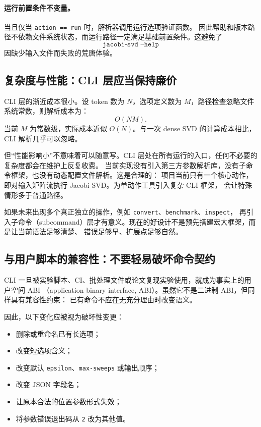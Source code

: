 \paragraph{运行前置条件不变量。}
当且仅当 \texttt{action == run} 时，解析器调用运行选项验证函数。
因此帮助和版本路径不依赖文件系统状态，而运行路径一定满足基础前置条件。这避免了
\[
    \texttt{jacobi-svd --help}
\]
因缺少输入文件而失败的荒唐体验。

\subsection{复杂度与性能：CLI 层应当保持廉价}

CLI 层的渐近成本很小。设 token 数为 $N$，选项定义数为 $M$，路径检查忽略文件系统常数，则解析成本为：
\[
    O(NM).
\]
当前 $M$ 为常数级，实际成本近似 $O(N)$。与一次 dense SVD 的计算成本相比，CLI 解析几乎可以忽略。

但“性能影响小”不意味着可以随意写。CLI 层处在所有运行的入口，任何不必要的复杂度都会在维护上反复收费。
当前实现没有引入第三方参数解析库，没有子命令框架，也没有动态配置文件解析。这是合理的：
项目当前只有一个核心动作，即对输入矩阵流执行 Jacobi SVD。为单动作工具引入复杂 CLI 框架，
会让特殊情形多于普通路径。

如果未来出现多个真正独立的操作，例如 \texttt{convert}、\texttt{benchmark}、\texttt{inspect}，
再引入子命令（subcommand）层才有意义。现在的好设计不是预先搭建宏大框架，而是让当前语法足够清楚、
错误足够早、扩展点足够自然。

\subsection{与用户脚本的兼容性：不要轻易破坏命令契约}

CLI 一旦被实验脚本、CI、批处理文件或论文复现实验使用，就成为事实上的用户空间 ABI
（application binary interface, ABI）。虽然它不是二进制 ABI，但同样具有兼容性约束：
已有命令不应在无充分理由时改变语义。

因此，以下变化应被视为破坏性变更：
\begin{itemize}
    \item 删除或重命名已有长选项；
    \item 改变短选项含义；
    \item 改变默认 \texttt{epsilon}、\texttt{max-sweeps} 或输出顺序；
    \item 改变 JSON 字段名；
    \item 让原本合法的位置参数形式失效；
    \item 将参数错误退出码从 \texttt{2} 改为其他值。
\end{itemize}


